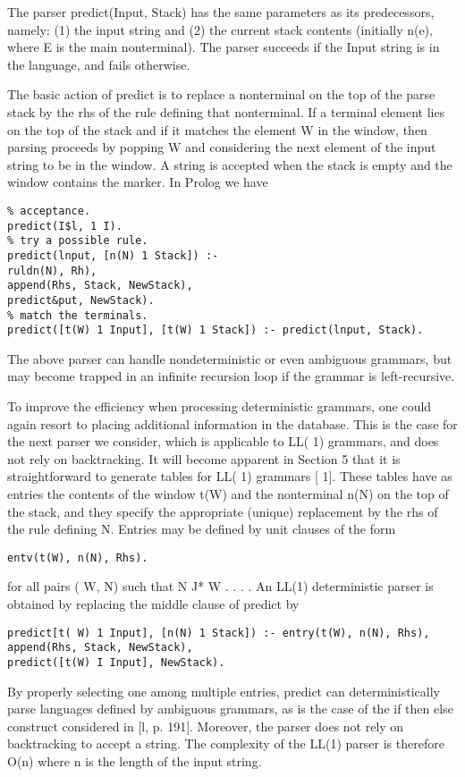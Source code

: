The parser predict(Input, Stack) has the same parameters as its predecessors,
namely: (1) the input string and (2) the current stack contents (initially n(e),
where E is the main nonterminal). The parser succeeds if the Input string is in
the language, and fails otherwise. 

The basic action of predict is to replace a nonterminal on the top of the parse
stack by the rhs of the rule defining that nonterminal. If a terminal element lies
on the top of the stack and if it matches the element W in the window, then
parsing proceeds by popping W and considering the next element of the input
string to be in the window. A string is accepted when the stack is empty and the
window contains the marker. In Prolog we have 
\begin{verbatim}
% acceptance.
predict(I$l, 1 I).
% try a possible rule.
predict(lnput, [n(N) 1 Stack]) :-
ruldn(N), Rh),
append(Rhs, Stack, NewStack),
predict&put, NewStack).
% match the terminals.
predict([t(W) 1 Input], [t(W) 1 Stack]) :- predict(lnput, Stack). 
\end{verbatim}
The above parser can handle nondeterministic or even ambiguous grammars, but
may become trapped in an infinite recursion loop if the grammar is left-recursive. 

To improve the efficiency when processing deterministic grammars, one could
again resort to placing additional information in the database. This is the case
for the next parser we consider, which is applicable to LL( 1) grammars, and does
not rely on backtracking. It will become apparent in Section 5 that it is straightforward
to generate tables for LL( 1) grammars [ 1]. These tables have as entries
the contents of the window t(W) and the nonterminal n(N) on the top of the
stack, and they specify the appropriate (unique) replacement by the rhs of the
rule defining N. Entries may be defined by unit clauses of the form 
\begin{verbatim}
entv(t(W), n(N), Rhs).
\end{verbatim}
for all pairs ( W, N) such that N J* W . . . . An LL(1) deterministic parser is
obtained by replacing the middle clause of predict by
\begin{verbatim}
predict[t( W) 1 Input], [n(N) 1 Stack]) :- entry(t(W), n(N), Rhs),
append(Rhs, Stack, NewStack),
predict([t(W) I Input], NewStack).   
\end{verbatim}

By properly selecting one among multiple entries, predict can deterministically
parse languages defined by ambiguous grammars, as is the case of the if then
else construct considered in [l, p. 191]. Moreover, the parser does not rely on
backtracking to accept a string. The complexity of the LL(1) parser is therefore
O(n) where n is the length of the input string.

 

\secup

\secup